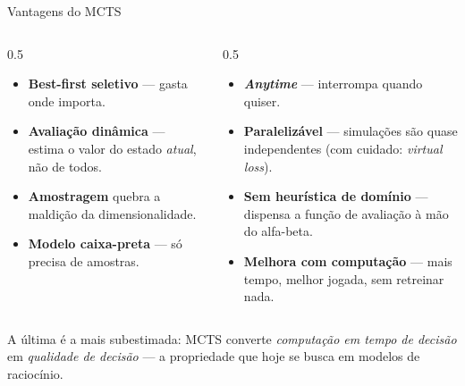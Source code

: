 \documentclass[aspectratio=169, 11pt]{beamer}
\begin{document}
\begin{frame}{Vantagens do MCTS}
  \begin{columns}[T]
    \begin{column}{0.5\textwidth}
      \begin{itemize}
        \item \textbf{Best-first seletivo} --- gasta onde importa.
        \item \textbf{Avaliação dinâmica} --- estima o valor do estado
              \emph{atual}, não de todos.
        \item \textbf{Amostragem} quebra a maldição da dimensionalidade.
        \item \textbf{Modelo caixa-preta} --- só precisa de amostras.
      \end{itemize}
    \end{column}
    \begin{column}{0.5\textwidth}
      \begin{itemize}
        \item \textbf{\emph{Anytime}} --- interrompa quando quiser.
        \item \textbf{Paralelizável} --- simulações são quase independentes
              (com cuidado: \emph{virtual loss}).
        \item \textbf{Sem heurística de domínio} --- dispensa a função de
              avaliação à mão do alfa-beta.
        \item \textbf{Melhora com computação} --- mais tempo, melhor jogada,
              sem retreinar nada.
      \end{itemize}
    \end{column}
  \end{columns}

  \vspace{0.2em}
  \begin{ideiabox}
    A última é a mais subestimada: MCTS converte \emph{computação em tempo de
    decisão} em \emph{qualidade de decisão} --- a propriedade que hoje se busca
    em modelos de raciocínio.
  \end{ideiabox}
\end{frame}
\end{document}
